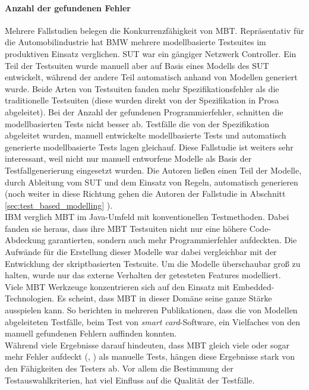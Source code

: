 \paragraph{Anzahl der gefundenen Fehler} Mehrere Fallstudien belegen die Konkurrenzfähigkeit von MBT. Repräsentativ für die Automobilindustrie hat BMW mehrere modellbasierte Testsuites im produktiven Einsatz verglichen.\cite{pretschner_one_2005} SUT war ein gängiger Netzwerk Controller. Ein Teil der Testsuiten wurde manuell aber auf Basis eines Modells des SUT entwickelt, während der andere Teil automatisch anhand von Modellen generiert wurde. Beide Arten von Testsuiten fanden mehr Spezifikationsfehler als die traditionelle Testsuiten (diese wurden direkt von der Spezifikation in Prosa abgeleitet). Bei der Anzahl der gefundenen Programmierfehler, schnitten die modellbasierten Tests nicht besser ab. Testfälle die von der Spezifikation abgeleitet wurden, manuell entwickelte modellbasierte Tests und automatisch generierte modellbasierte Tests lagen gleichauf. Diese Fallstudie ist weiters sehr interessant, weil nicht nur manuell entworfene Modelle als Basis der Testfallgenerierung eingesetzt wurden. Die Autoren ließen einen Teil der Modelle, durch Ableitung vom SUT und dem Einsatz von Regeln, automatisch generieren (noch weiter in diese Richtung gehen die Autoren der Fallstudie in Abschnitt \ref{sec:test_based_modelling} ).\\
IBM verglich MBT im Java-Umfeld mit konventionellen Testmethoden\cite{farchi_using_2002}. Dabei fanden sie heraus, dass ihre MBT Testsuiten nicht nur eine höhere Code-Abdeckung garantierten, sondern auch mehr Programmierfehler aufdeckten. Die Aufwände für die Erstellung dieser Modelle war dabei vergleichbar mit der Entwicklung der skriptbasierten Testsuite. Um die Modelle überschaubar groß zu halten, wurde nur das externe Verhalten der getesteten Features modelliert.\\
Viele MBT Werkzeuge konzentrieren sich auf den Einsatz mit Embedded-Technologien. Es scheint, dass MBT in dieser Domäne seine ganze Stärke ausspielen kann. So berichten \citeauthor{legeard_generation_2001} in mehreren Publikationen\cite{legeard_generation_2001}, dass die von Modellen abgeleiteten Testfälle,  beim Test von \textit{smart card}-Software, ein Vielfaches von den manuell gefundenen Fehlern auffinden konnten.\\
Während viele Ergebnisse darauf hindeuten, dass MBT gleich viele oder sogar mehr Fehler aufdeckt (\cite{dalal_model-based_1999}, \cite{legeard_generation_2001}) als manuelle Tests, hängen diese Ergebnisse stark von den Fähigkeiten des Testers ab. Vor allem die Bestimmung der Testauswahlkriterien, hat viel Einfluss auf die Qualität der Testfälle\cite{utting_practical_2007}.

